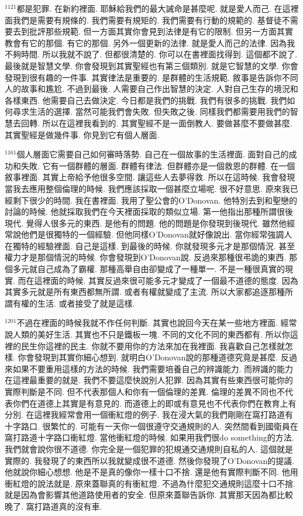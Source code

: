 \documentclass{book}
\begin{document}
$^{1121}$都是犯罪.
在新約裡面.
耶穌給我們的最大誡命是甚麼呢.
就是愛人而己.
在這裡面我們是需要有規條的.
我們需要有規矩的.
我們需要有行動的規範的.
基督徒不需要去到批評那些規範.
但一方面其實你會見到法律是有它的限制.
但另一方面其實教會有它的那個.
有它的那個.
另外一個更新的法律.
就是愛人而己的法律.
因為我不夠時間.
所以我就不說了.
但都很清楚的.
你可以在書裡面找得到.
這個都不說了.
最後就是智慧文學.
你會發現到其實聖經也有第三個類別.
就是它智慧的文學.
你會發現到很有趣的一件事.
其實律法是重要的.
是群體的生活規範.
敘事是告訴你不同人的故事和尷尬.
不過到最後.
人需要自己作出智慧的決定.
人對自己生存的境況和各樣東西.
他需要自己去做決定.
今日都是我們的挑戰.
我們有很多的挑戰.
我們如何尋求生活的選擇.
當然可能我們會失敗.
但失敗之後.
同樣我們都需要用我們的智慧去回轉.
所以在這裡我看到的.
其實聖經不是一面倒教人.
要做甚麼不要做甚麼.
其實聖經是做幾件事.
你見到它有個人層面.

$^{1161}$個人層面它需要自己如何審時落勢.
自己在一個故事的生活裡面.
面對自己的成功和失敗.
它有一個群體的層面.
群體有律法.
但群體亦是一個救恩的群體.
在一個敘事裡面.
其實上帝給予他很多空間.
讓這些人去夢得救.
所以在這時候.
我會發現當我去應用整個倫理的時候.
我們應該採取一個甚麼立場呢.
很不好意思.
原來我已經剩下很少的時間.
我在書裡面.
我用了聖公會的O'Donovan.
他特別去到和聖戀的討論的時候.
他就採取我們在今天裡面採取的類似立場.
第一他指出那種所謂很後現代.
覺得人很多元的東西.
是他有的問題.
他的問題是你發現到後現代.
雖然他經常說他們是很獨特的一個經驗.
但他同樣O'Donovan就好像說出.
當你經常強調人在獨特的經驗裡面.
自己是這樣.
到最後的時候.
你就發現多元才是那個情況.
甚至權力才是那個情況的時候.
你會發現到O'Donovan說.
反過來那種很弔詭的東西.
那個多元就自己成為了霸權.
那種高舉自由卻變成了一種單一.
不是一種很真實的現實.
而在這裡面的時候.
其實反過來很可能多元才變成了一個最不道德的態度.
因為其實多元就是所有東西都無所謂.
或者有權就變成了主流.
所以大家都追逐那種所謂有權的生活.
或者接受了就是這樣.

$^{1201}$不過在裡面的時候我就不作任何判斷.
其實也說回今天在某一些地方裡面.
經常說人類的美好生活.
其實也不只是鐵板一塊.
不同的文化不同的東西都有.
所以你這裡的民生你這裡的民主.
你就不要用你的方法來加在我裡面.
我喜歡自己怎樣就怎樣.
你會發現到其實你細心想到.
就明白O'Donovan說的那種道德究竟是甚麼.
反過來如果不要重用這樣的方法的時候.
我們需要培養自己的辨識能力.
而辨識的能力在這裡最重要的就是.
我們不要這麼快說別人犯罪.
因為其實有些東西很可能你的實際判斷是不同.
但不代表那個人和你有一個倫理的差異.
倫理的差異不同也不代表你們在道德上其實是有意見的.
而道德上的即或有意見也不代表你們在教育上有分別.
在這裡我經常會用一個衝紅燈的例子.
我在浸大氣的我們剛剛在窩打路道有十字路口.
很繁忙的.
可能有一天你一個很遵守交通規則的人.
突然間看到國衛員在窩打路道十字路口衝紅燈.
當他衝紅燈的時候.
如果用我們很do something的方法.
我們就會說你很不道德.
你完全是一個犯罪的犯規通交通規則自私的人.
這個就是實際的.
我發現了的東西所以我就變成很不道德.
然後你發現了O'Donovan的提議.
他就說你細心想想.
他是不是真的像你一樣十口不捨.
還是他有實際判斷不同.
他用衝紅燈的說法就是.
原來蓋聯真的有衝紅燈.
不過為什麼犯交通規則這麼十口不捨.
就是因為會影響其他道路使用者的安全.
但原來蓋聯告訴你.
其實那天因為都比較晚了.
窩打路道真的沒有車.
\end{document}

